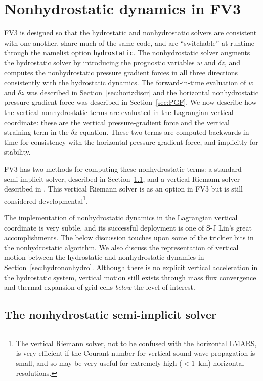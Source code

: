 \documentclass[10pt,letterpaper,margin=1in]{memoir}
\begin{document}
\chapter{Nonhydrostatic dynamics in FV3} \label{chap:nonhydro}

FV3 is designed so that the hydrostatic and nonhydrostatic solvers are consistent with one another, share much of the same code, and are ``switchable'' at runtime through the namelist option \texttt{hydrostatic}. The nonhydrostatic solver augments the hydrostatic solver by introducing the prognostic variables $w$ and $\delta z$, and computes the nonhydrostatic pressure gradient forces in all three directions consistently with the hydrostatic dynamics. The forward-in-time evaluation of $w$ and $\delta z$ was described in Section~\ref{sec:horizdiscr} and the horizontal nonhydrostatic pressure gradient force was described in Section~\ref{sec:PGF}. We now describe how the vertical nonhydrostatic terms are evaluated in the Lagrangian vertical coordinate: these are the vertical pressure-gradient force and the vertical straining term in the $\delta z$ equation. These two terms are computed backwards-in-time for consistency with the horizontal pressure-gradient force, and implicitly for stability.

FV3 has  two methods for computing these  nonhydrostatic terms: a standard semi-implicit solver, described in Section~\ref{sec:SI}, and a vertical Riemann solver described in \citep{XChen2013}. This vertical Riemann solver is as an option in FV3 but is still considered developmental\footnote{The vertical Riemann solver, not to be confused with the horizontal LMARS, is very efficient if the Courant number for vertical sound wave propagation is small, and so may be very useful for extremely high ($<1$~km) horizontal resolutions.}.

The implementation of nonhydrostatic dynamics in the Lagrangian vertical coordinate is very subtle, and its successful deployment is one of S-J Lin's great accomplishments. The below discussion touches upon some of the trickier bits in the nonhydrostatic algorithm. We also discuss the representation of vertical motion between the hydrostatic and nonhydrostatic dynamics in  Section~\ref{sec:hydrononhydro}. Although there is no explicit vertical acceleration in the hydrostatic system, vertical motion still exists through mass flux convergence and thermal expansion of grid cells \textit{below} the level of interest. 

\section{The nonhydrostatic semi-implicit solver} \label{sec:SI}
\end{document}

